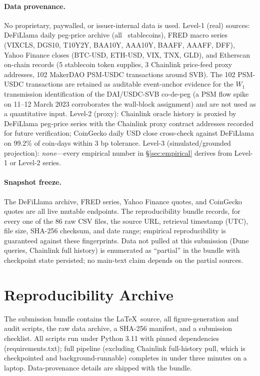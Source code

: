 \paragraph{Data provenance.} No proprietary, paywalled, or issuer-internal data is used. Level-1 (real) sources: DeFiLlama daily peg-price archive (all \NPANEL\ stablecoins), FRED macro series (VIXCLS, DGS10, T10Y2Y, BAA10Y, AAA10Y, BAAFF, AAAFF, DFF), Yahoo Finance closes (BTC-USD, ETH-USD, VIX, TNX, GLD), and Etherscan on-chain records (5 stablecoin token supplies, 3 Chainlink price-feed proxy addresses, 102 MakerDAO PSM-USDC transactions around SVB). The 102 PSM-USDC transactions are retained as auditable event-anchor evidence for the $W_1$ transmission identification of the DAI/USDC-SVB co-de-peg (a PSM flow spike on 11--12 March 2023 corroborates the wall-block assignment) and are not used as a quantitative input. Level-2 (proxy): Chainlink oracle history is proxied by DeFiLlama peg-price series with the Chainlink proxy contract addresses recorded for future verification; CoinGecko daily USD close cross-check against DeFiLlama on 99.2\% of coin-days within 3 bp tolerance. Level-3 (simulated/grounded projection): \emph{none}---every empirical number in \S\ref{sec:empirical} derives from Level-1 or Level-2 series.

\paragraph{Snapshot freeze.} The DeFiLlama archive, FRED series, Yahoo Finance quotes, and CoinGecko quotes are all live mutable endpoints. The reproducibility bundle records, for every one of the 86 raw CSV files, the source URL, retrieval timestamp (UTC), file size, SHA-256 checksum, and date range; empirical reproducibility is guaranteed against these fingerprints. Data not pulled at this submission (Dune queries, Chainlink full history) is enumerated as ``partial'' in the bundle with checkpoint state persisted; no main-text claim depends on the partial sources.

\section{Reproducibility Archive}\label{app:repro}
The submission bundle contains the \LaTeX\ source, all figure-generation and audit scripts, the raw data archive, a SHA-256 manifest, and a submission checklist. All scripts run under Python 3.11 with pinned dependencies (requirements.txt); full pipeline (excluding Chainlink full-history pull, which is checkpointed and background-runnable) completes in under three minutes on a laptop. Data-provenance details are shipped with the bundle.

